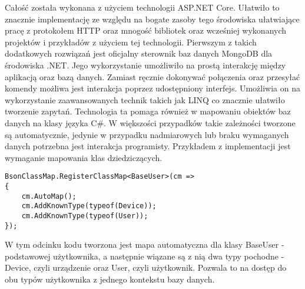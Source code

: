 Całość została wykonana z użyciem technologii ASP.NET Core.
Ułatwiło to znacznie implementację ze względu na bogate zasoby
tego środowiska ułatwiające pracę z protokołem HTTP oraz mnogość
bibliotek oraz wcześniej wykonanych projektów i przykładów z użyciem
tej technologii. 
Pierwszym z takich dodatkowych rozwiązań jest oficjalny sterownik
baz danych MongoDB dla środowiska .NET. Jego wykorzystanie 
umożliwiło na prostą interakcję między aplikacją oraz bazą
danych. Zamiast ręcznie dokonywać połączenia oraz przesyłać
komendy możliwa jest interakcja poprzez udostępniony interfejs.
Umożliwia on na wykorzystanie zaawansowanych technik takich jak
LINQ co znacznie ułatwiło tworzenie zapytań. Technologia ta
pomaga również w mapowaniu obiektów baz danych na klasy języka C\#.
W większości przypadków takie zależności tworzone są automatycznie,
jedynie w przypadku nadmiarowych lub braku wymaganych danych potrzebna
jest interakcja programisty. Przykładem z implementacji jest wymaganie
mapowania klas dziedziczących.
\begin{lstlisting}
BsonClassMap.RegisterClassMap<BaseUser>(cm =>
{
    cm.AutoMap();
    cm.AddKnownType(typeof(Device));
    cm.AddKnownType(typeof(User));
});
\end{lstlisting}
W tym odcinku kodu tworzona jest mapa automatyczna dla klasy BaseUser - podstawowej
użytkownika, a następnie wiązane są z nią dwa typy pochodne - Device, czyli urządzenie
oraz User, czyli użytkownik. Pozwala to na dostęp do obu typów użytkownika
z jednego kontekstu bazy danych.

